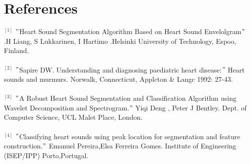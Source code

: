 \documentclass{article}
\begin{document}
\section{References}
$^{[1]}$ $"$Heart Sound Segmentation Algorithm Based on Heart Sound Envelolgram$"$ .H Liang, S Lukkarinen, I Hartimo .Helsinki University of Technology, Espoo, Finland.\\\\
$^{[2]}$ $"$Sapire DW. Understanding and diagnosing paediatric heart disease:$"$ Heart sounds and murmurs. Norwalk, Connecticut, Applcton \& Langc 1992: 27-43. \\\\
$^{[3]}$ $"$A Robust Heart Sound Segmentation and Classification Algorithm using Wavelet Decomposition and Spectrogram.$"$ Yiqi Deng , Peter J Bentley. Dept. of Computer Science, UCL Malet Place, London. \\\\
$^{[4]}$ $"$Classifying heart sounds using peak location for segmentation and feature construction.$"$ Emanuel Pereira,Elsa Ferreira Gomes. Institute of Engineering (ISEP/IPP) Porto,Portugal. 
\end{document}

